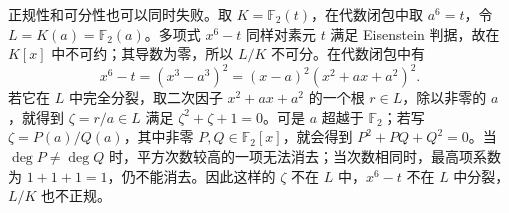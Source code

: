 \ProseParagraphBreak
正规性和可分性也可以同时失败。取 \(K=\mathbb F_2(t)\)，在代数闭包中取 \(a^6=t\)，令 \(L=K(a)=\mathbb F_2(a)\)。多项式 \(x^6-t\) 同样对素元 \(t\) 满足 Eisenstein 判据，故在 \(K[x]\) 中不可约；其导数为零，所以 \(L/K\) 不可分。在代数闭包中有
\[
	x^6-t=(x^3-a^3)^2 =(x-a)^2(x^2+ax+a^2)^2.
\]
若它在 \(L\) 中完全分裂，取二次因子 \(x^2+ax+a^2\) 的一个根 \(r\in L\)，除以非零的 \(a\)，就得到 \(\zeta=r/a\in L\) 满足 \(\zeta^2+\zeta+1=0\)。可是 \(a\) 超越于 \(\mathbb F_2\)；若写 \(\zeta=P(a)/Q(a)\)，其中非零 \(P,Q\in\mathbb F_2[x]\)，就会得到 \(P^2+PQ+Q^2=0\)。当 \(\deg P\ne\deg Q\) 时，平方次数较高的一项无法消去；当次数相同时，最高项系数为 \(1+1+1=1\)，仍不能消去。因此这样的 \(\zeta\) 不在 \(L\) 中，\(x^6-t\) 不在 \(L\) 中分裂，\(L/K\) 也不正规。
